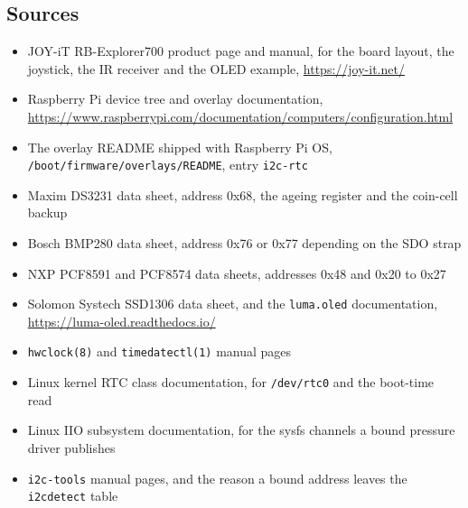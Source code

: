 \subsection*{Sources}

\begin{itemize}
\item JOY-iT RB-Explorer700 product page and manual, for the board layout, the joystick, the IR receiver and the OLED example, \url{https://joy-it.net/}
\item Raspberry Pi device tree and overlay documentation, \url{https://www.raspberrypi.com/documentation/computers/configuration.html}
\item The overlay README shipped with Raspberry Pi OS, \texttt{/boot/firmware/overlays/README}, entry \texttt{i2c-rtc}
\item Maxim DS3231 data sheet, address 0x68, the ageing register and the coin-cell backup
\item Bosch BMP280 data sheet, address 0x76 or 0x77 depending on the SDO strap
\item NXP PCF8591 and PCF8574 data sheets, addresses 0x48 and 0x20 to 0x27
\item Solomon Systech SSD1306 data sheet, and the \texttt{luma.oled} documentation, \url{https://luma-oled.readthedocs.io/}
\item \texttt{hwclock(8)} and \texttt{timedatectl(1)} manual pages
\item Linux kernel RTC class documentation, for \texttt{/dev/rtc0} and the boot-time read
\item Linux IIO subsystem documentation, for the sysfs channels a bound pressure driver publishes
\item \texttt{i2c-tools} manual pages, and the reason a bound address leaves the \texttt{i2cdetect} table
\end{itemize}

